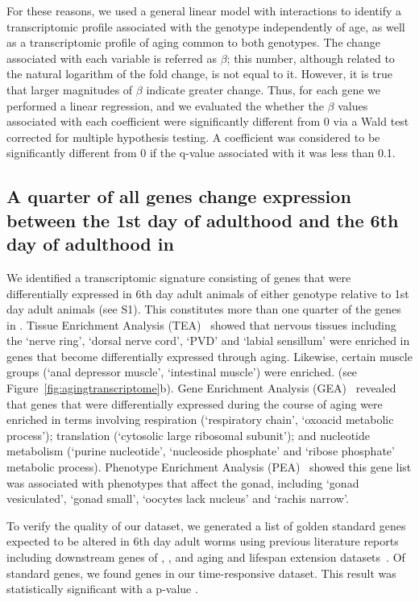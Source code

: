 For these reasons, we used a general linear model with interactions to identify
a transcriptomic profile associated with the \fog{} genotype independently of
age, as well as a transcriptomic profile of \cel{} aging common to both
genotypes. The change associated with each variable is referred as $\beta$; this
number, although related to the natural logarithm of the fold change, is not
equal to it. However, it is true that larger magnitudes of $\beta$ indicate
greater change. Thus, for each gene we performed a linear regression, and we
evaluated the whether the $\beta$ values associated with each coefficient were
significantly different from 0 via a Wald test corrected for multiple hypothesis
testing. A coefficient was considered to be significantly different from 0 if
the q-value associated with it was less than 0.1.

\subsection*{A quarter of all genes change expression between the 1st day of
             adulthood and the 6th day of adulthood in \cel{}}
We identified a transcriptomic signature consisting of \agen{} genes that were
differentially expressed in 6th day adult animals of either genotype relative to
1st day adult animals (see S1). This constitutes more than one quarter of
the genes in \cel{}. Tissue Enrichment Analysis
(TEA)~\citep{Angeles-Albores2016} showed that nervous tissues including the
`nerve ring', `dorsal nerve cord', `PVD' and `labial sensillum' were enriched in
genes that become differentially expressed through aging. Likewise, certain
muscle groups (`anal depressor muscle', `intestinal muscle') were enriched. (see
Figure~\ref{fig:agingtranscriptome}b). Gene Enrichment Analysis
(GEA)~\citep{Angeles-AlboresPEA} revealed that genes that were differentially
expressed during the course of aging were enriched in terms involving
respiration (`respiratory chain', `oxoacid metabolic process'); translation
(`cytosolic large ribosomal subunit'); and nucleotide metabolism (`purine
nucleotide', `nucleoside phosphate' and `ribose phosphate' metabolic process).
Phenotype Enrichment Analysis (PEA)~\citep{Angeles-AlboresPEA} showed this
gene list was associated with phenotypes that affect the \cel{} gonad, including
`gonad vesiculated', `gonad small', `oocytes lack nucleus' and `rachis narrow'.

To verify the quality of our dataset, we generated a list of \goldn{} golden
standard genes expected to be altered in 6th day adult worms using previous
literature reports including downstream genes of , ,
and aging and lifespan extension datasets~\citep{Murphy2003,
Halaschek-wiener2005,Lund2002,McCormick2012,Eckley2013}. Of \goldn{}
standard genes, we found \goldfound{} genes in our time-responsive dataset. This
result was statistically significant with a p-value \goldpval{}.

